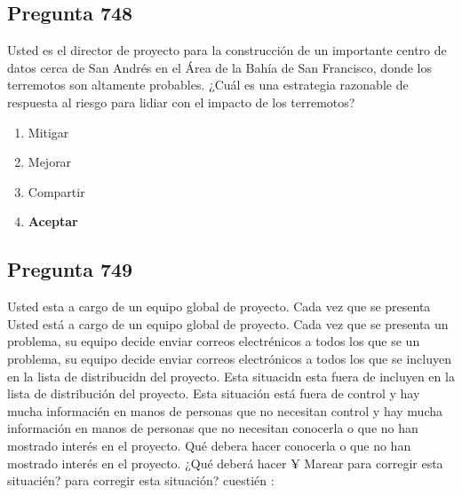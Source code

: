 \documentclass[11pt,a4paper]{article}
\begin{document}
\subsection*{Pregunta 748}
Usted es el director de proyecto para la construcción de un importante centro de datos cerca de San Andrés en el Área de la Bahía de San Francisco, donde los terremotos son altamente probables. ¿Cuál es una estrategia razonable de respuesta al riesgo para lidiar con el impacto de los terremotos?

\begin{enumerate}[label=\alph*)]
  \item Mitigar
  \item Mejorar
  \item Compartir
  \item \textbf{Aceptar}
\end{enumerate}

\subsection*{Pregunta 749}
Usted esta a cargo de un equipo global de proyecto. Cada vez que se presenta Usted está a cargo de un equipo global de proyecto. Cada vez que se presenta un problema, su equipo decide enviar correos electrénicos a todos los que se un problema, su equipo decide enviar correos electrónicos a todos los que se incluyen en la lista de distribucidn del proyecto. Esta situacidn esta fuera de incluyen en la lista de distribución del proyecto. Esta situación está fuera de control y hay mucha informacién en manos de personas que no necesitan control y hay mucha información en manos de personas que no necesitan conocerla o que no han mostrado interés en el proyecto. Qué debera hacer conocerla o que no han mostrado interés en el proyecto. ¿Qué deberá hacer ¥ Marear para corregir esta situacién? para corregir esta situación? cuestién :
\end{document}
